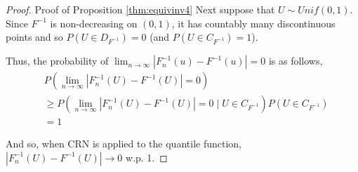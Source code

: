 \documentclass[12pt]{article}
\theoremstyle{plain}%
\theoremstyle{definition}
\begin{document}
\begin{proof}{Proof of Proposition \ref{thm:equivinv4}}
		Next suppose that $U\sim Unif(0,1)$. Since $F^{-1}$ is non-decreasing on $(0,1)$, it has countably many discontinuous points and so $P(U\in D_{F^{-1}})=0$ (and $P(U\in C_{F^{-1}})=1$).
		
		Thus, the probability of $\lim_{n\to \infty} |F^{-1}_{n}(u)- F^{-1}(u)|=0$ is as follows,
		\begin{align*}
			&P(\lim_{n\to \infty} |F^{-1}_{n}(U)- F^{-1}(U)|=0)\\
			&\geq P( \lim_{n\to \infty} |F^{-1}_{n}(U)- F^{-1}(U)|=0\mid U\in C_{F^{-1}})P(U\in C_{F^{-1}}) \\
			&=1
		\end{align*}
		
		And so, when CRN is applied to the quantile function, $|F^{-1}_n(U)-F^{-1}(U)|\to 0$ w.p. 1.
	\end{proof}
	
\end{document}

